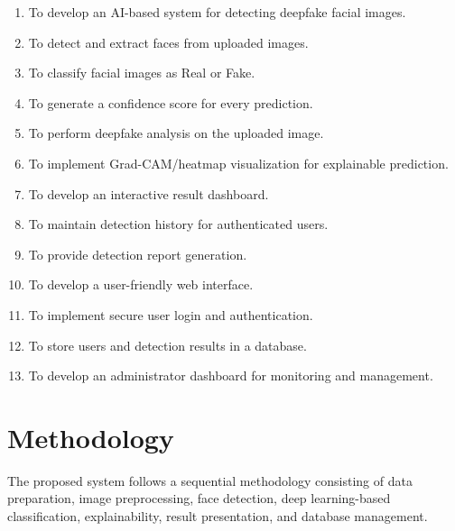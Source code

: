 \documentclass[12pt,a4paper,oneside]{report}
\begin{document}
\begin{enumerate}
    \item To develop an AI-based system for detecting deepfake facial images.
    
    \item To detect and extract faces from uploaded images.
    
    \item To classify facial images as Real or Fake.
    
    \item To generate a confidence score for every prediction.
    
    \item To perform deepfake analysis on the uploaded image.
    
    \item To implement Grad-CAM/heatmap visualization for explainable prediction.
    
    \item To develop an interactive result dashboard.
    
    \item To maintain detection history for authenticated users.
    
    \item To provide detection report generation.
    
    \item To develop a user-friendly web interface.
    
    \item To implement secure user login and authentication.
    
    \item To store users and detection results in a database.
    
    \item To develop an administrator dashboard for monitoring and management.
\end{enumerate}


\chapter{Methodology}

The proposed system follows a sequential methodology consisting of data preparation, image preprocessing, face detection, deep learning-based classification, explainability, result presentation, and database management.
\end{document}
